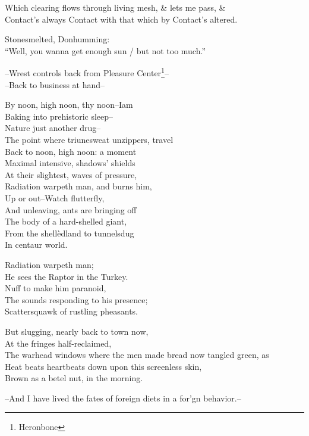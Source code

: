 Which clearing flows through living mesh, \& lets me pass, \& \\
Contact's always Contact with that which by Contact's altered.

\secdiv


Stonesmelted, Donhumming: \\
``Well, you wanna get enough sun / but not too much.''

--Wrest controls back from Pleasure Center\footnote{Heronbone}-- \\
--Back to business at hand--

By noon, high noon, thy noon--Iam \\
Baking into prehistoric sleep-- \\
Nature just another drug-- \\
The point where triunesweat unzippers, travel \\
Back to noon, high noon: a moment \\
Maximal intensive, shadows' shields \\
At their slightest, waves of pressure, \\
Radiation warpeth man, and burns him, \\
Up or out--Watch flutterfly, \\
And unleaving, ants are bringing off \\
The body of a hard-shelled giant, \\
From the shellèdland to tunnelsdug \\
In centaur world. 

Radiation warpeth man; \\
He sees the Raptor in the Turkey. \\
Nuff to make him paranoid, \\
The sounds responding to his presence; \\
Scattersquawk of rustling pheasants.

But slugging, nearly back to town now, \\
At the fringes half-reclaimed, \\
The warhead windows where the men made bread now tangled green, as \\
Heat beats heartbeats down upon this screenless skin, \\
Brown as a betel nut, in the morning.

--And I have lived the fates of foreign diets in a for'gn behavior.--